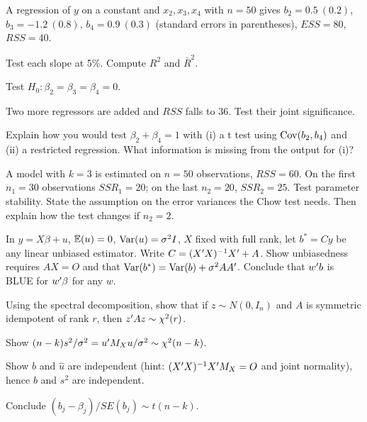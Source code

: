 \documentclass[11pt]{article}
\begin{document}
A regression of $y$ on a constant and $x_{2}, x_{3}, x_{4}$ with $n = 50$ gives
$b_{2} = 0.5\ (0.2)$, $b_{3} = -1.2\ (0.8)$, $b_{4} = 0.9\ (0.3)$ (standard errors in
parentheses), $ESS = 80$, $RSS = 40$.
\begin{flatlist}
  \item[(a)] Test each slope at 5\%. Compute $R^{2}$ and $\bar R^{2}$.
  \item[(b)] Test $H_{0}: \beta_{2} = \beta_{3} = \beta_{4} = 0$.
  \item[(c)] Two more regressors are added and $RSS$ falls to $36$. Test their joint significance.
  \item[(d)] Explain how you would test $\beta_{2} + \beta_{4} = 1$ with (i) a t test using
        $\operatorname{Cov}(b_{2},b_{4})$ and (ii) a restricted regression. What information is
        missing from the output for (i)?
\end{flatlist}

A model with $k = 3$ is estimated on $n = 50$ observations, $RSS = 60$. On the
first $n_{1} = 30$ observations $SSR_{1} = 20$; on the last $n_{2} = 20$,
$SSR_{2} = 25$. Test parameter stability. State the assumption on the error
variances the Chow test needs. Then explain how the test changes if $n_{2} = 2$.

In $y = X\beta + u$, $\mathbb{E}(u) = 0$, $\operatorname{Var}(u) = \sigma^{2}I$, $X$ fixed with full rank,
let $b^{*} = Cy$ be any linear unbiased estimator. Write $C = (X^{\prime} X)^{-1}X^{\prime} + A$.
Show unbiasedness requires $AX = O$ and that $\operatorname{Var}(b^{*}) = \operatorname{Var}(b) + \sigma^{2}AA^{\prime}$.
Conclude that $w^{\prime} b$ is BLUE for $w^{\prime}\beta$ for any $w$.

\begin{flatlist}
  \item[(a)] Using the spectral decomposition, show that if $z \sim N(0,I_{n})$ and $A$ is
        symmetric idempotent of rank $r$, then $z^{\prime} Az \sim \chi^{2}(r)$.
  \item[(b)] Show $(n-k)s^{2}/\sigma^{2} = u^{\prime} M_{X}u/\sigma^{2} \sim \chi^{2}(n-k)$.
  \item[(c)] Show $b$ and $\hat u$ are independent (hint: $(X^{\prime} X)^{-1}X^{\prime} M_{X} = O$
        and joint normality), hence $b$ and $s^{2}$ are independent.
  \item[(d)] Conclude $(b_{j} - \beta_{j})/SE(b_{j}) \sim t(n-k)$.
\end{flatlist}
\end{document}

